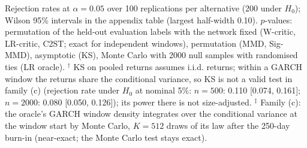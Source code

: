 Rejection rates at $\alpha=0.05$ over 100 replications per alternative (200 under $H_0$); Wilson 95\% intervals in the appendix table (largest half-width 0.10).
$p$-values: permutation of the held-out evaluation labels with the network fixed (W-critic, LR-critic, C2ST; exact for independent windows), permutation (MMD, Sig-MMD), asymptotic (KS), Monte Carlo with 2000 null samples with randomised ties (LR oracle).
$^{\dagger}$ KS on pooled returns assumes i.i.d. returns; within a GARCH window the returns share the conditional variance, so KS is not a valid test in family (c) (rejection rate under $H_0$ at nominal 5\%: $n=500$: 0.110 [0.074, 0.161]; $n=2000$: 0.080 [0.050, 0.126]); its power there is not size-adjusted.
$^{\ddagger}$ Family (c): the oracle's GARCH window density integrates over the conditional variance at the window start by Monte Carlo, $K=512$ draws of its law after the 250-day burn-in (near-exact; the Monte Carlo test stays exact).
